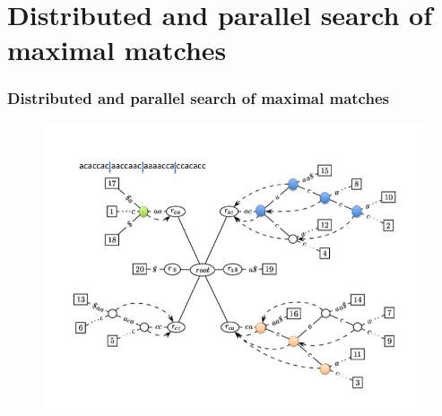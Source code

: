 \documentclass{beamer}
\begin{document}
\section{Distributed and parallel search of maximal matches}
\begin{frame}
  \frametitle{Distributed and parallel search of maximal matches}
  \begin{figure}
    \includegraphics[scale=0.4]{dst_search.png}
  \end{figure}
\end{frame}
\end{document}
